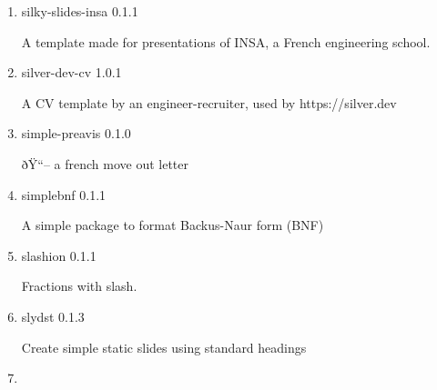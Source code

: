 \begin{enumerate}

  { silky-report-insa } { 0.4.0 }

  A template made for reports and other documents of INSA, a French
  engineering school.
\item
  \href{/universe/package/silky-slides-insa/}{}


  { silky-slides-insa } { 0.1.1 }

  A template made for presentations of INSA, a French engineering
  school.
\item
  \href{/universe/package/silver-dev-cv/}{}


  { silver-dev-cv } { 1.0.1 }

  A CV template by an engineer-recruiter, used by https://silver.dev
\item
  \href{/universe/package/simple-preavis/}{}


  { simple-preavis } { 0.1.0 }

  ðŸ``-- a french move out letter
\item
  \href{/universe/package/simplebnf/}{}

  { simplebnf } { 0.1.1 }

  A simple package to format Backus-Naur form (BNF)
\item
  \href{/universe/package/slashion/}{}

  { slashion } { 0.1.1 }

  Fractions with slash.
\item
  \href{/universe/package/slydst/}{}


  { slydst } { 0.1.3 }

  Create simple static slides using standard headings
\item
  \href{/universe/package/smooth-tmlr/}{}


\end{enumerate}
